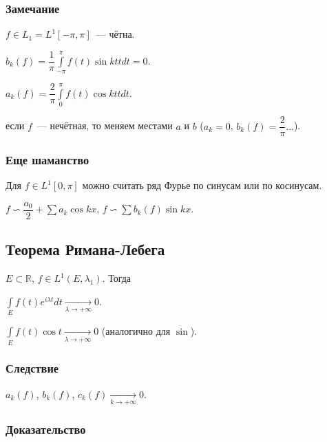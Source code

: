 \documentclass{article}
\begin{document}
        \subsubsection{Замечание}
        
            $f \in L_1 = L^1 [-\pi, \pi]$~--- чётна.
            
            $b_k(f) = \dfrac{1}{\pi} \int\limits^{\pi}_{-\pi} f(t) \sin {kt} t dt = 0$.
            
            $a_k(f) = \dfrac{2}{\pi} \int\limits^{\pi}_0 f(t) \cos {kt} t dt$.
            
            если $f$~--- нечётная, то меняем местами $a$ и $b$ ($a_k = 0$, $b_k(f) = \dfrac{2}{\pi} \ldots$).
            
        \subsubsection{Еще шаманство}
        
            Для $f \in L^1 [0, \pi]$ можно считать ряд Фурье по синусам или по косинусам.
            
            $f \backsim \dfrac{a_0}{2} + \sum a_k \cos {kx}$, $f \backsim \sum b_k(f) \sin {kx}$.
    
    \subsection{Теорема Римана-Лебега}
    
        $E \subset \mathbb{R}$, $f \in L^1(E, \lambda_1)$. Тогда
        
        $\int\limits_E f(t) e^{i \lambda t} dt \xrightarrow[\lambda \rightarrow +\infty]{} 0$.
        
        $\int\limits_E f(t) \cos{t} \xrightarrow[\lambda \rightarrow +\infty]{} 0$ (аналогично для $\sin$).
        
        \subsubsection{Следствие}
        
            $a_k(f)$, $b_k(f)$, $c_k(f) \xrightarrow[k \rightarrow +\infty]{} 0$.
            
        \subsubsection{Доказательство}
        
\end{document}
